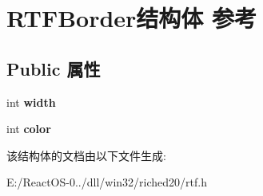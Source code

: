 \hypertarget{struct_r_t_f_border}{}\section{R\+T\+F\+Border结构体 参考}
\label{struct_r_t_f_border}
\subsection*{Public 属性}
\begin{DoxyCompactItemize}
\item 
\mbox{\label{struct_r_t_f_border_a5f9e43f8833a63e179be30c41aa1802c}} 
int {\bfseries width}
\item 
\mbox{\label{struct_r_t_f_border_a51b3e127f14717ec983084042b6ee89b}} 
int {\bfseries color}
\end{DoxyCompactItemize}


该结构体的文档由以下文件生成\+:\begin{DoxyCompactItemize}
\item 
E\+:/\+React\+O\+S-\/0../dll/win32/riched20/rtf.\+h\end{DoxyCompactItemize}
